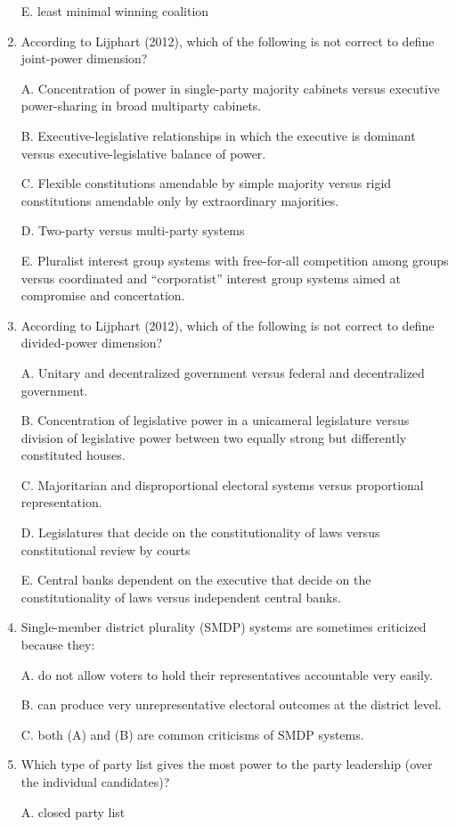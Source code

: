 \documentclass[
]{book}
\begin{document}
\begin{enumerate}
  E. least minimal winning coalition
\item
  According to Lijphart (2012), which of the following is not correct to define joint-power dimension?

  A. Concentration of power in single-party majority cabinets versus executive power-sharing in broad multiparty cabinets.

  B. Executive-legislative relationships in which the executive is dominant versus executive-legislative balance of power.

  C. Flexible constitutions amendable by simple majority versus rigid constitutions amendable only by extraordinary majorities.

  D. Two-party versus multi-party systems

  E. Pluralist interest group systems with free-for-all competition among groups versus coordinated and ``corporatist'' interest group systems aimed at compromise and concertation.
\item
  According to Lijphart (2012), which of the following is not correct to define divided-power dimension?

  A. Unitary and decentralized government versus federal and decentralized government.

  B. Concentration of legislative power in a unicameral legislature versus division of legislative power between two equally strong but differently constituted houses.

  C. Majoritarian and disproportional electoral systems versus proportional representation.

  D. Legislatures that decide on the constitutionality of laws versus constitutional review by courts

  E. Central banks dependent on the executive that decide on the constitutionality of laws versus independent central banks.
\item
  Single-member district plurality (SMDP) systems are sometimes criticized because they:

  A. do not allow voters to hold their representatives accountable very easily.

  B. can produce very unrepresentative electoral outcomes at the district level.

  C. both (A) and (B) are common criticisms of SMDP systems.
\item
  Which type of party list gives the most power to the party leadership (over the individual candidates)?

  A. closed party list


\end{enumerate}
\end{document}
